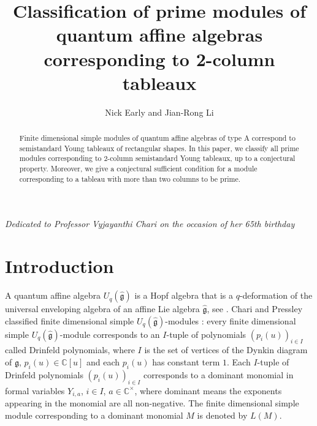 \documentclass[12pt, reqno]{amsart}
\theoremstyle{plain}
\theoremstyle{definition}
\numberwithin{equation}{section}
\newcommand{\CC}{{\mathbb {C}}}
\newenvironment{nouppercase}{%
	\let\uppercase\relax%
	\renewcommand{\uppercasenonmath}[1]{}}{}
\begin{document}
\title[Classification of prime modules corresponding to 2-column tableaux]{Classification of prime modules of quantum affine algebras corresponding to 2-column tableaux} 

\author{Nick Early and Jian-Rong Li}
\address{Nick Early, Institute for Advanced Study, Princeton, NJ.}

\address{Jian-Rong Li, Faculty of Mathematics, University of Vienna, Oskar-Morgenstern-Platz 1, 1090 Vienna, Austria.} 

\date{}
\begin{nouppercase}
\maketitle
\end{nouppercase}

{\centering\footnotesize \textit{Dedicated to Professor Vyjayanthi Chari on the occasion of her 65th birthday}\par}

\begin{abstract} 
Finite dimensional simple modules of quantum affine algebras of type A correspond to semistandard Young tableaux of rectangular shapes. In this paper, we classify all prime modules corresponding to 2-column semistandard Young tableaux, up to a conjectural property.
Moreover, we give a conjectural sufficient condition for a module corresponding to a tableau with more than two columns to be prime. 
\end{abstract}

\section{Introduction}

A quantum affine algebra $U_q(\widehat{\mathfrak{g}})$ is a Hopf algebra that is a $q$-deformation of the universal enveloping algebra of an affine Lie algebra $\widehat{\mathfrak{g}}$, see \cite{CP94}. Chari and Pressley classified finite dimensional simple $U_q(\widehat{\mathfrak{g}})$-modules \cite{CP91, CP94}: every finite dimensional simple $U_q(\widehat{\mathfrak{g}})$-module corresponds to an $I$-tuple of polynomials $(p_i(u))_{i \in I}$ called Drinfeld polynomials, where $I$ is the set of vertices of the Dynkin diagram of $\mathfrak{g}$, $p_i(u) \in \CC[u]$ and each $p_i(u)$ has constant term $1$. Each $I$-tuple of Drinfeld polynomials $(p_i(u))_{i \in I}$ corresponds to a dominant monomial in formal variables $Y_{i,a}$, $i \in I$, $a \in \mathbb{C}^{\times}$, where dominant means the exponents appearing in the monomial are all non-negative. The finite dimensional simple module corresponding to a dominant monomial $M$ is denoted by $L(M)$. 
\end{document}
